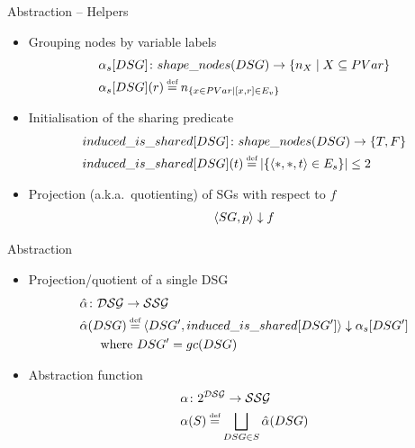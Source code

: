 \documentclass[xcolor={usenames,dvipsnames}]{beamer}
\newcommand\defeq{\stackrel{\mathclap{\tiny\mbox{def}}}{=}}
\begin{document}
\begin{frame}{Abstraction -- Helpers}
  \begin{itemize}
  \item Grouping nodes by variable labels
    \begin{align*}
      \alpha_s[DSG] &\colon shape\_nodes(DSG) \to \setof{n_X}{X
        \subseteq PVar}\\
      \alpha_s[DSG] &(r) \defeq n_{\setof{ x \in PVar }{[x, r] \in
          E_v}}
    \end{align*}
  \item Initialisation of the sharing predicate
    \begin{align*}
      induced\_is\_shared[DSG] &\colon shape\_nodes(DSG) \to \set{T, F}\\
      induced\_is\_shared[DSG] &(t) \defeq \abs{\set{\tpl{*, *, t} \in
          E_s}} \leq 2
    \end{align*}
  \item Projection (a.k.a.\ quotienting) of SGs with respect to $f$
    \begin{align*}
      \langle SG, p \rangle \downarrow f
    \end{align*}
  \end{itemize}
\end{frame}

\begin{frame}{Abstraction}
  \begin{itemize}
  \item Projection/quotient of a single DSG
    \begin{align*}
      \hat{\alpha} &\colon \mathcal{DSG} \to \mathcal{SSG}\\
      \hat{\alpha} &(DSG) \defeq \tpl{DSG', induced\_is\_shared[DSG']}
      \downarrow \alpha_s[DSG']\\
      &\quad \text{where } DSG' = gc(DSG)
    \end{align*}
  \item Abstraction function
    \begin{align*}
      \alpha &\colon 2^{\mathcal{DSG}} \to \mathcal{SSG}\\
      \alpha &(S) \defeq \bigsqcup_{DSG \in S} \hat{\alpha}(DSG)
    \end{align*}
  \end{itemize}
\end{frame}
\end{document}
